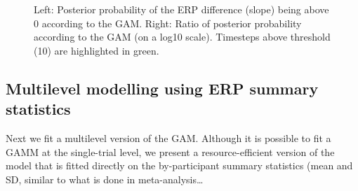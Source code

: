 \documentclass[
  doc,
  floatsintext,
  longtable,
  a4paper,
  nolmodern,
  notxfonts,
  notimes,
  colorlinks=true,linkcolor=blue,citecolor=blue,urlcolor=blue]{apa7}
\begin{document}
\begin{figure}[!htb]

\caption{\label{fig-post-prob-ratio}Left: Posterior probability of the
ERP difference (slope) being above 0 according to the GAM. Right: Ratio
of posterior probability according to the GAM (on a log10 scale).
Timesteps above threshold (10) are highlighted in green.}


\end{figure}%

\newpage

\subsection{Multilevel modelling using ERP summary
statistics}\label{multilevel-modelling-using-erp-summary-statistics}

Next we fit a multilevel version of the GAM. Although it is possible to
fit a GAMM at the single-trial level, we present a resource-efficient
version of the model that is fitted directly on the by-participant
summary statistics (mean and SD, similar to what is done in
meta-analysis\ldots{}
\end{document}

